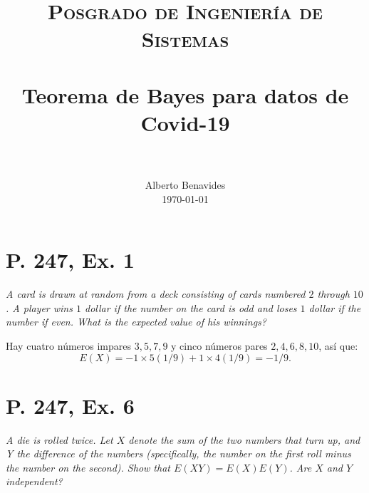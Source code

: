 \documentclass[paper=leter, fontsize=11pt]{scrartcl}
\title{
		\usefont{OT1}{bch}{b}{n}
		\normalfont \normalsize \textsc{Posgrado de Ingeniería de Sistemas} \\ [25pt]
		\horrule{0.5pt} \\[0.4cm]
		\huge Teorema de Bayes para datos de Covid-19 \\
		\horrule{2pt} \\[0.5cm]
}
\author{
		\normalfont 								\normalsize
        Alberto Benavides\\[-3pt]		\normalsize
        \today
}
\date{}
\numberwithin{equation}{section}		%
\numberwithin{figure}{section}			%
\numberwithin{table}{section}				%
\begin{document}
 
\maketitle

\section*{P. 247, Ex. 1}
\emph{A card is drawn at random from a deck consisting of cards numbered $2$ through $10$. A player wins $1$ dollar if the number on the card is odd and loses $1$ dollar if the number if even. What is the expected value of his winnings?}

Hay cuatro números impares $3, 5, 7, 9$ y cinco números pares $2, 4, 6, 8, 10$, así que:
\begin{equation*}
    E(X) = -1 \times 5 (1/9) + 1 \times 4 (1/9) = -1/9.
\end{equation*}

\section*{P. 247, Ex. 6}
\emph{A die is rolled twice. Let $X$ denote the sum of the two numbers that turn up, and Y the difference of the numbers (specifically, the number on the first roll minus the number on the second). Show that $E(X Y) = E(X)E(Y )$. Are $X$ and $Y$ independent?}
\end{document}
